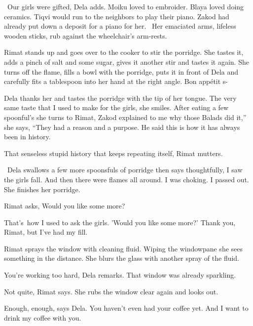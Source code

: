 \documentclass[12pt]{book}
\begin{document}
~{\textquotedbl}Our girls were gifted,{\textquotedbl} Dela adds. {\textquotedbl}Moiku loved to embroider. Blaya loved
doing ceramics. Tiqvi would run to the neighbors to play their piano. Zakod had already put down a deposit for a piano
for her.{\textquotedbl} \ Her emaciated arms, lifeless wooden sticks, rub against the wheelchair's arm-rests.

Rimat stands up and goes over to the cooker to stir the porridge. She tastes it, adds a pinch of salt and some sugar,
gives it another stir and tastes it again. She turns off the flame, fills a bowl with the porridge, puts it in front of
Dela and carefully fits a tablespoon into her hand at the right angle. {\textquotedbl}Bon app\'etit s-{\textquotedbl}

Dela thanks her and tastes the porridge with the tip of her tongue. {\textquotedbl}The very same taste that I used to
make for the girls,{\textquotedbl} she smiles. After eating a few spoonful's she turns to Rimat, {\textquotedbl}Zakod
explained to me why those Balads did it,'' she says, ``They had a reason and a purpose. He said this is how it has
always been in history.{\textquotedbl}

{\textquotedbl}That senseless stupid history that keeps repeating itself,{\textquotedbl} Rimat mutters.

~Dela swallows a few more spoonsfuls of porridge then says thoughtfully, {\textquotedbl}I saw the girls fall. And then
there were flames all around. I was choking. I passed out.{\textquotedbl} She finishes her porridge.

Rimat asks, {\textquotedbl}Would you like some more?{\textquotedbl}

{\textquotedbl}That's~how I used to ask the girls. 'Would you like some more?' Thank you, Rimat, but I've had my
fill.{\textquotedbl}

Rimat sprays the window with cleaning fluid. Wiping the windowpane she sees something{ }in the distance.
She blurs the glass with another spray of the fluid.

{\textquotedbl}You're working too hard,{\textquotedbl} Dela remarks. {\textquotedbl}That window was already
sparkling.{\textquotedbl}

{\textquotedbl}Not quite,{\textquotedbl} Rimat says. She rubs the window clear again and looks out.

{\textquotedbl}Enough, enough,{\textquotedbl} says Dela. {\textquotedbl}You haven't even had your coffee yet.
And{ }I want to drink my coffee with you.{\textquotedbl}
\end{document}
